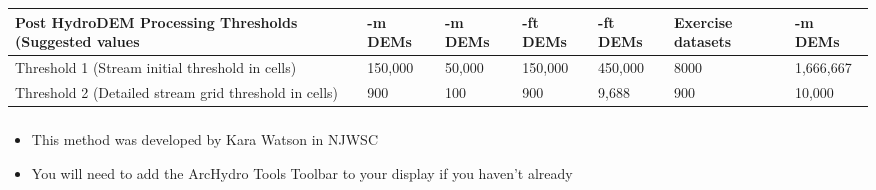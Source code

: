 \documentclass[letterpaper,10pt,english]{sphinxmanual}
\begin{document}
\begin{savenotes}\sphinxattablestart
\centering
\begin{tabulary}{\linewidth}[t]{|T|T|T|T|T|T|T|}
\hline
\sphinxstyletheadfamily 
Post
HydroDEM
Processing
Thresholds
(Suggested
values
&-m
DEMs
&-m
DEMs
&-ft
DEMs
&-ft
DEMs
&\sphinxstyletheadfamily 
Exercise
datasets
&-m
DEMs
\\
\hline
Threshold 1
(Stream
initial
threshold in
cells)
&
150,000
&
50,000
&
150,000
&
450,000
&
8000
&
1,666,667
\\
\hline
Threshold 2
(Detailed
stream grid
threshold in
cells)
&
900
&
100
&
900
&
9,688
&
900
&
10,000
\\
\hline
\end{tabulary}
\par
\sphinxattableend\end{savenotes}


\subparagraph{}
\label{\detokenize{ex_2:post-hydrodem-processing}}

\subparagraph{}
\label{\detokenize{ex_2:post-hydrodem-no-sinks}}

\subparagraph{}
\label{\detokenize{ex_2:kara-s-method-probably-the-one-you-should-use}}\begin{itemize}
\item {} 
This method was developed by Kara Watson in NJWSC

\item {} 
You will need to add the ArcHydro Tools Toolbar to your display if you haven’t already

\end{itemize}
\end{document}
